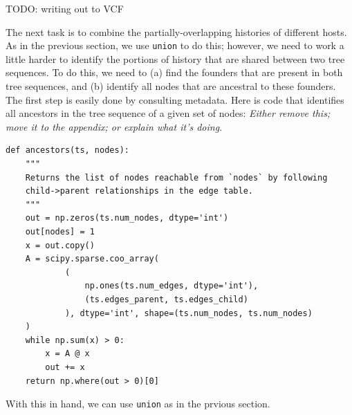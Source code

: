 \documentclass[12pt]{article}
\newcommand{\comment}[1]{\textit{\color{green} #1}}
\begin{document}
TODO: writing out to VCF

The next task is to combine the partially-overlapping histories of different hosts.
As in the previous section, we use \verb|union| to do this;
however, we need to work a little harder
to identify the portions of history that are shared between two tree sequences.
To do this, we need to
(a) find the founders that are present in both tree sequences,
and (b) identify all nodes that are ancestral to these founders.
The first step is easily done by consulting metadata.
Here is code that identifies all ancestors in the tree sequence
of a given set of nodes:
\comment{Either remove this; move it to the appendix; or explain what it's doing.}
\begin{verbatim}
def ancestors(ts, nodes):
    """
    Returns the list of nodes reachable from `nodes` by following
    child->parent relationships in the edge table.
    """
    out = np.zeros(ts.num_nodes, dtype='int')
    out[nodes] = 1
    x = out.copy()
    A = scipy.sparse.coo_array(
            (
                np.ones(ts.num_edges, dtype='int'),
                (ts.edges_parent, ts.edges_child)
            ), dtype='int', shape=(ts.num_nodes, ts.num_nodes)
    )
    while np.sum(x) > 0:
        x = A @ x
        out += x
    return np.where(out > 0)[0]
\end{verbatim}
With this in hand, we can use \verb|union|
as in the prvious section.
\end{document}
